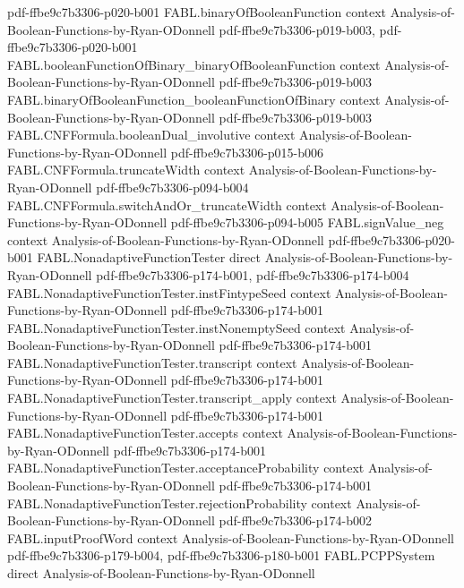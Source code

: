 \begin{theorem}
{    pdf-ffbe9c7b3306-p020-b001}
\proofstep
  {FABL.binaryOfBooleanFunction}
  {context}
  {Analysis-of-Boolean-Functions-by-Ryan-ODonnell}
  {pdf-ffbe9c7b3306-p019-b003,
    pdf-ffbe9c7b3306-p020-b001}
\proofstep
  {FABL.booleanFunctionOfBinary_binaryOfBooleanFunction}
  {context}
  {Analysis-of-Boolean-Functions-by-Ryan-ODonnell}
  {pdf-ffbe9c7b3306-p019-b003}
\proofstep
  {FABL.binaryOfBooleanFunction_booleanFunctionOfBinary}
  {context}
  {Analysis-of-Boolean-Functions-by-Ryan-ODonnell}
  {pdf-ffbe9c7b3306-p019-b003}
\proofstep
  {FABL.CNFFormula.booleanDual_involutive}
  {context}
  {Analysis-of-Boolean-Functions-by-Ryan-ODonnell}
  {pdf-ffbe9c7b3306-p015-b006}
\proofstep
  {FABL.CNFFormula.truncateWidth}
  {context}
  {Analysis-of-Boolean-Functions-by-Ryan-ODonnell}
  {pdf-ffbe9c7b3306-p094-b004}
\proofstep
  {FABL.CNFFormula.switchAndOr_truncateWidth}
  {context}
  {Analysis-of-Boolean-Functions-by-Ryan-ODonnell}
  {pdf-ffbe9c7b3306-p094-b005}
\proofstep
  {FABL.signValue_neg}
  {context}
  {Analysis-of-Boolean-Functions-by-Ryan-ODonnell}
  {pdf-ffbe9c7b3306-p020-b001}
\proofstep
  {FABL.NonadaptiveFunctionTester}
  {direct}
  {Analysis-of-Boolean-Functions-by-Ryan-ODonnell}
  {pdf-ffbe9c7b3306-p174-b001,
    pdf-ffbe9c7b3306-p174-b004}
\proofstep
  {FABL.NonadaptiveFunctionTester.instFintypeSeed}
  {context}
  {Analysis-of-Boolean-Functions-by-Ryan-ODonnell}
  {pdf-ffbe9c7b3306-p174-b001}
\proofstep
  {FABL.NonadaptiveFunctionTester.instNonemptySeed}
  {context}
  {Analysis-of-Boolean-Functions-by-Ryan-ODonnell}
  {pdf-ffbe9c7b3306-p174-b001}
\proofstep
  {FABL.NonadaptiveFunctionTester.transcript}
  {context}
  {Analysis-of-Boolean-Functions-by-Ryan-ODonnell}
  {pdf-ffbe9c7b3306-p174-b001}
\proofstep
  {FABL.NonadaptiveFunctionTester.transcript_apply}
  {context}
  {Analysis-of-Boolean-Functions-by-Ryan-ODonnell}
  {pdf-ffbe9c7b3306-p174-b001}
\proofstep
  {FABL.NonadaptiveFunctionTester.accepts}
  {context}
  {Analysis-of-Boolean-Functions-by-Ryan-ODonnell}
  {pdf-ffbe9c7b3306-p174-b001}
\proofstep
  {FABL.NonadaptiveFunctionTester.acceptanceProbability}
  {context}
  {Analysis-of-Boolean-Functions-by-Ryan-ODonnell}
  {pdf-ffbe9c7b3306-p174-b001}
\proofstep
  {FABL.NonadaptiveFunctionTester.rejectionProbability}
  {context}
  {Analysis-of-Boolean-Functions-by-Ryan-ODonnell}
  {pdf-ffbe9c7b3306-p174-b002}
\proofstep
  {FABL.inputProofWord}
  {context}
  {Analysis-of-Boolean-Functions-by-Ryan-ODonnell}
  {pdf-ffbe9c7b3306-p179-b004,
    pdf-ffbe9c7b3306-p180-b001}
\proofstep
  {FABL.PCPPSystem}
  {direct}
  {Analysis-of-Boolean-Functions-by-Ryan-ODonnell}

\end{theorem}
